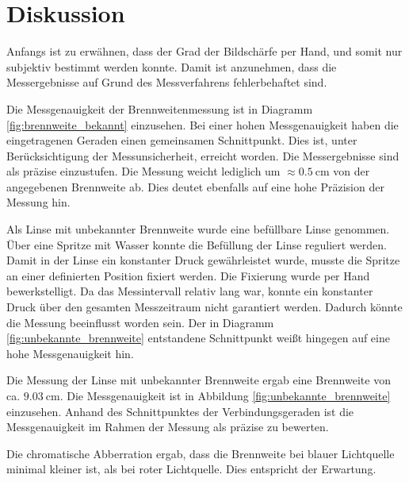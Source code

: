 \section{Diskussion}

Anfangs ist zu erwähnen, dass der Grad der Bildschärfe per Hand, und somit
nur subjektiv bestimmt werden konnte. Damit ist anzunehmen, dass die Messergebnisse
auf Grund des Messverfahrens fehlerbehaftet sind.

Die Messgenauigkeit der Brennweitenmessung ist in Diagramm
\ref{fig:brennweite_bekannt} einzusehen. Bei einer hohen Messgenauigkeit haben
die eingetragenen Geraden einen gemeinsamen Schnittpunkt. Dies ist, unter
Berücksichtigung der Messunsicherheit, erreicht worden. Die Messergebnisse
sind als präzise einzustufen. Die Messung weicht lediglich um
$\approx\SI{0,5}{\centi\meter}$ von der angegebenen Brennweite ab. Dies deutet
ebenfalls auf eine hohe Präzision der Messung hin.

Als Linse mit unbekannter Brennweite wurde eine befüllbare Linse genommen. Über eine
Spritze mit Wasser konnte die Befüllung der Linse reguliert werden.
Damit in der Linse ein konstanter Druck gewährleistet wurde, musste die Spritze an
einer definierten Position fixiert werden.
Die Fixierung wurde per Hand bewerkstelligt. Da das Messintervall relativ lang
war, konnte ein konstanter Druck über den gesamten Messzeitraum nicht
garantiert werden. Dadurch könnte
die Messung beeinflusst worden sein. Der in Diagramm
\ref{fig:unbekannte_brennweite} entstandene Schnittpunkt weißt hingegen auf eine
hohe Messgenauigkeit hin.

Die Messung der Linse mit unbekannter Brennweite ergab eine Brennweite von ca. $\SI{9,03}{\centi\meter}$.
Die Messgenauigkeit ist in Abbildung \ref{fig:unbekannte_brennweite} einzusehen.
Anhand des Schnittpunktes der Verbindungsgeraden ist die Messgenauigkeit im Rahmen
der Messung als präzise zu bewerten.

Die chromatische Abberration ergab, dass die Brennweite bei blauer Lichtquelle
minimal kleiner ist, als bei roter Lichtquelle. Dies entspricht der Erwartung.
